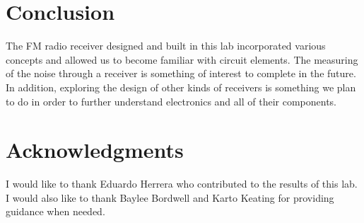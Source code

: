 \documentclass[12pt]{article}
\begin{document}
\section {Conclusion}
The FM radio receiver designed and built in this lab incorporated
various concepts and allowed us to become familiar with circuit
elements. The measuring of the noise through a receiver is something of
interest to complete in the future. In addition, exploring the design of
other kinds of receivers is something we plan to do in order to further
understand electronics and all of their components.

\section {Acknowledgments}
I would like to thank Eduardo Herrera who contributed to the results of
this lab. I would also like to thank Baylee Bordwell and Karto Keating
for providing guidance when needed. 
\end{document}

